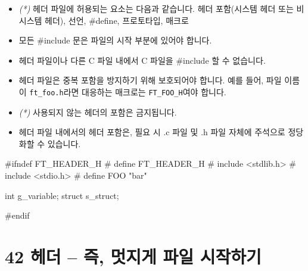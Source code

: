 \documentclass{42-ko}
\begin{document}
        \begin{itemize}

            \item \textit{(*)} 헤더 파일에 허용되는 요소는 다음과 같습니다.
              헤더 포함(시스템 헤더 또는 비 시스템 헤더), 선언, #define, 
              프로토타입, 매크로

            \item 모든 #include 문은 파일의 시작 부분에 있어야 합니다.

            \item 헤더 파일이나 다른 C 파일 내에서 C 파일을 #include 할 수 없습니다.

            \item 헤더 파일은 중복 포함을 방지하기 위해 보호되어야 합니다. 
              예를 들어, 파일 이름이 \texttt{ft\_foo.h}라면 대응하는 매크로는 
              \texttt{FT\_FOO\_H}여야 합니다.

            \item \textit{(*)} 사용되지 않는 헤더의 포함은 금지됩니다.

            \item 헤더 파일 내에서의 헤더 포함은, 필요 시 .c 파일 및 .h 파일 자체에 
              주석으로 정당화할 수 있습니다.

        \end{itemize}

\vspace{1cm}

        \begin{42ccode}
#ifndef FT_HEADER_H
# define FT_HEADER_H
# include <stdlib.h>
# include <stdio.h>
# define FOO "bar"

int		  g_variable;
struct	s_struct;

#endif
        \end{42ccode}
        \newpage



   \section{42 헤더 – 즉, 멋지게 파일 시작하기}
\end{document}
